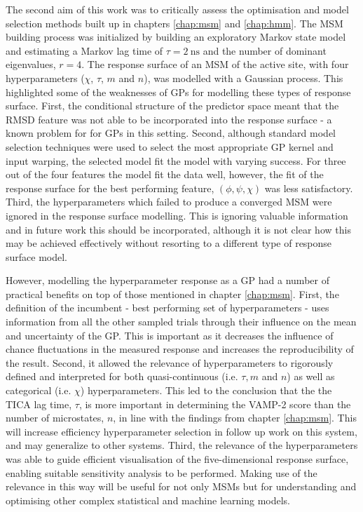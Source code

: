 The second aim of this work was to critically assess the optimisation and model selection methods built up in chapters \ref{chap:msm} and \ref{chap:hmm}.  The MSM building process was initialized by building an exploratory Markov state model and estimating a Markov lag time of $\tau=\SI{2}{\nano\second}$ and the number of dominant eigenvalues, $r=4$. The response surface of an MSM of the active site, with four hyperparameters ($\chi$, $\tau$, $m$ and $n$), was modelled with a Gaussian process. This highlighted some of the weaknesses of GPs for modelling these types of response surface. First, the conditional structure of the predictor space meant that the RMSD feature was not able to be incorporated into the response surface - a known problem for for GPs in this setting. Second, although standard model selection techniques were used to select the most appropriate GP kernel and input warping, the selected model fit the model with varying success. For three out of the four features the model fit the data well, however, the fit of the response surface for the best performing feature, $(\phi, \psi, \chi)$  was less satisfactory. Third, the hyperparameters which failed to produce a converged MSM were ignored in the response surface modelling. This is ignoring valuable information and in future work this should be incorporated, although it is not clear how this may be achieved effectively without resorting to a different type of response surface model.  

However, modelling the hyperparameter response as a GP had a number of practical benefits on top of those mentioned in chapter \ref{chap:msm}. First, the definition of the incumbent -  best performing set of hyperparameters - uses information from all the other sampled trials through their influence on the mean and uncertainty of the GP. This is important as it decreases the influence of chance fluctuations in the measured response and increases the reproducibility of the result. Second, it allowed the relevance of hyperparameters to rigorously defined and interpreted for both quasi-continuous (i.e. $\tau, m$ and $n$) as well as categorical (i.e. $\chi$) hyperparameters. This led to the conclusion that the the TICA lag time, $\tau$, is more important in determining the VAMP-2 score than the number of microstates, $n$, in line with the findings from chapter \ref{chap:msm}. This will increase efficiency hyperparameter selection in follow up work on this system, and may generalize to other systems.  Third, the relevance of the hyperparameters was able to guide efficient visualisation of the five-dimensional response surface, enabling suitable sensitivity analysis to be performed. Making use of the relevance in this way will be useful for not only MSMs but for understanding and optimising other complex statistical and machine learning models.  

